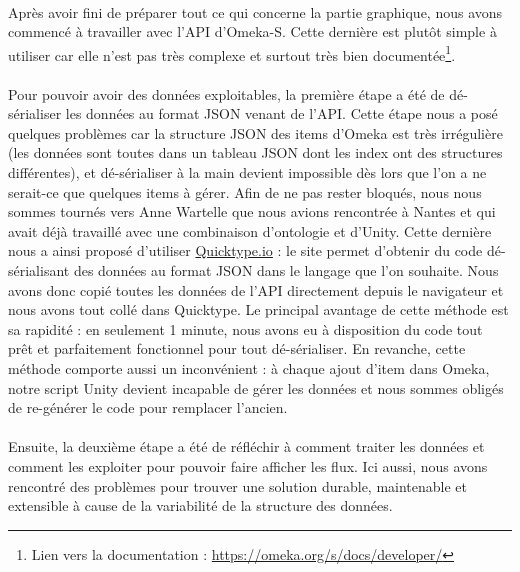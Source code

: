 \paragraph{} \hspace{10mm}
Après avoir fini de préparer tout ce qui concerne la partie graphique, nous avons commencé à travailler avec l'API d'Omeka-S. Cette dernière est plutôt simple à utiliser car elle n'est pas très complexe et surtout très bien documentée\footnote{Lien vers la documentation : \hyperlink{https://omeka.org/s/docs/developer/}{https://omeka.org/s/docs/developer/}}. 

\paragraph{} \hspace{10mm}
Pour pouvoir avoir des données exploitables, la première étape a été de dé-sérialiser les données au format JSON venant de l'API. Cette étape nous a posé quelques problèmes car la structure JSON des items d'Omeka est très irrégulière (les données sont toutes dans un tableau JSON dont les index ont des structures différentes), et dé-sérialiser à la main devient impossible dès lors que l'on a ne serait-ce que quelques items à gérer. Afin de ne pas rester bloqués, nous nous sommes tournés vers Anne Wartelle que nous avions rencontrée à Nantes et qui avait déjà travaillé avec une combinaison d'ontologie et d'Unity. Cette dernière nous a ainsi proposé d'utiliser \hyperlink{https://quicktype.io/}{Quicktype.io} : le site permet d'obtenir du code dé-sérialisant des données au format JSON dans le langage que l'on souhaite. Nous avons donc copié toutes les données de l'API directement depuis le navigateur et nous avons tout collé dans Quicktype. Le principal avantage de cette méthode est sa rapidité : en seulement 1 minute, nous avons eu à disposition du code tout prêt et parfaitement fonctionnel pour tout dé-sérialiser. En revanche, cette méthode comporte aussi un inconvénient : à chaque ajout d'item dans Omeka, notre script Unity devient incapable de gérer les données et nous sommes obligés de re-générer le code pour remplacer l'ancien.

\paragraph{} \hspace{10mm}
Ensuite, la deuxième étape a été de réfléchir à comment traiter les données et comment les exploiter pour pouvoir faire afficher les flux. Ici aussi, nous avons rencontré des problèmes pour trouver une solution durable, maintenable et extensible à cause de la variabilité de la structure des données.

